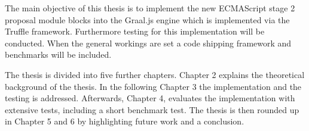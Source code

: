The main objective of this thesis is to implement the new ECMAScript stage 2 proposal module blocks into the Graal.js engine which is implemented via the Truffle framework. Furthermore testing for this implementation will be conducted. When the general workings are set a code shipping framework and benchmarks will be included.

The thesis is divided into five further chapters. Chapter 2 explains the theoretical background of the thesis. In the following Chapter 3 the implementation and the testing is addressed. Afterwards, Chapter 4, evaluates the implementation with extensive tests, including a short benchmark test. The thesis is then rounded up in Chapter 5 and 6 by highlighting future work and a conclusion.



